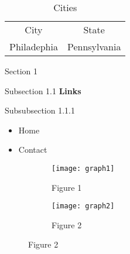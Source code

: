 

  \begin{table}
    \begin{tabular}{c c}
      City & State \\
      Philadephia & Pennsylvania \\
    \end{tabular}
    \caption{Cities}
    \label{table1}
    \small
    \centering
  \end{table}

  \begin{section}{Section 1}
    \begin{subsection}{Subsection 1.1}
      \textbf{Links}
      \begin{subsubsection}{Subsubsection 1.1.1}
        \begin{itemize}
          \item Home
          \item Contact
        \end{itemize}
      \end{subsubsection}
    \end{subsection}
  \end{section}

  \begin{figure}
    \begin{subfigure}{\linewidth}
      \texttt{[image: graph1]}
      \caption{Figure 1}
    \end{subfigure}
    \begin{subfigure}{\linewidth}
      \texttt{[image: graph2]}
      \caption{Figure 2}
    \end{subfigure}
  \end{figure}

